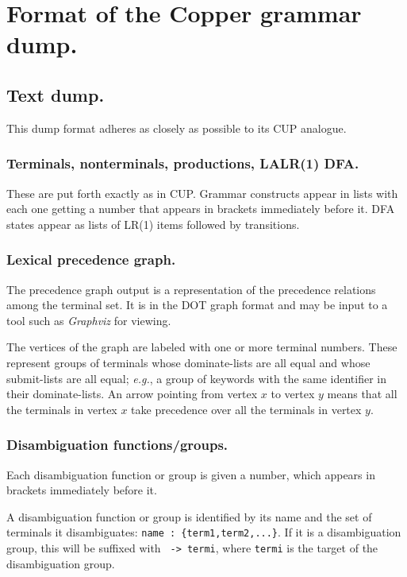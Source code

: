 \documentclass[12pt,english,twoside]{report}
\begin{document}
\section{\label{sec:Dump-format}Format of the Copper grammar dump.}

\subsection{Text dump.}

This dump format adheres as closely as possible to its CUP analogue.


\subsubsection{Terminals, nonterminals, productions, LALR(1) DFA.}

These are put forth exactly as in CUP. Grammar constructs appear in
lists with each one getting a number that appears in brackets immediately
before it. DFA states appear as lists of LR(1) items followed by transitions.

\subsubsection{Lexical precedence graph.}

The precedence graph output is a representation of the precedence
relations among the terminal set. It is in the DOT graph format and
may be input to a tool such as \emph{Graphviz} for viewing.

The vertices of the graph are labeled with one or more terminal
numbers. These represent groups of terminals whose dominate-lists are
all equal and whose submit-lists are all equal; \emph{e.g.}, a group
of keywords with the same identifier in their dominate-lists. An arrow
pointing from vertex $x$ to vertex $y$ means that all the terminals in
vertex $x$ take precedence over all the terminals in vertex $y$.

\subsubsection{Disambiguation functions/groups.}

Each disambiguation function or group is given a number, which appears
in brackets immediately before it.

A disambiguation function or group is identified by its name and the
set of terminals it disambiguates: \texttt{name :
  \{term1,term2,...\}}. If it is a disambiguation group, this will be
suffixed with \texttt{ -> termi}, where \texttt{termi} is the target
of the disambiguation group.
\end{document}
